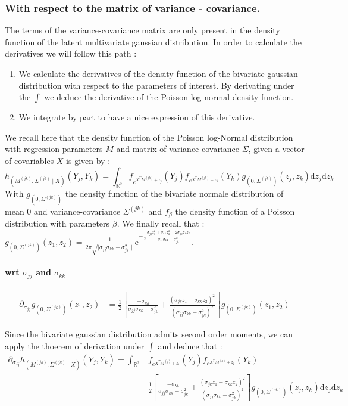 \documentclass[11pt, a4paper]{article}
\begin{document}
\subsubsection{With respect to the matrix of variance - covariance.}
The terms of the variance-covariance matrix are only present in the density function of the latent multivariate gaussian distribution. In order to calculate the derivatives we will  follow this path :
\begin{enumerate}
\item We calculate the derivatives of the density function of the bivariate gaussian distribution with respect to the parameters of interest. By derivating under the $\int$ we deduce the derivative of the Poisson-log-normal density function.
\item We integrate by part to have a nice expression of this derivative.
\end{enumerate}
We recall here that the density function of the Poisson log-Normal distribution with regression parameters $M$ and matrix of variance-covariance $\Sigma$, given a vector of covariables $X$ is given by :
\begin{equation*}
h_{(M^{(jk)},\Sigma^{(jk)} \mid X)}(Y_j,Y_k)=\int_{\mathbb{R}^2} f_{e^{X^T M^{(jk)}+z_j}}(Y_j) f_{e^{X^T M^{(jk)}+z_k}}(Y_k) g_{(0,\Sigma^{(jk)})}(z_j,z_k) \mathrm{d}z_j \mathrm{d}z_k
\end{equation*}
With $g_{(0,\Sigma^{(jk)})}$ the density function of the bivariate normale distribution of mean $0$ and variance-covariance $\Sigma^{(jk)}$ and $f_{\beta}$ the density function of a Poisson distribution with parameters $\beta$.
We finally recall that : $g_{(0,\Sigma^{(jk)})}(z_1,z_2)=\frac{1}{2 \pi \sqrt{\mid \sigma_{jj} \sigma_{kk}-\sigma_{jk}^2}\mid} \mathrm{e}^{-\frac{1}{2} \frac{\sigma_{jj} z_1^2 + \sigma_{kk} z_2^2 -2 \sigma_{jk} z_1 z_2}{\sigma_{jj} \sigma_{kk}-\sigma_{jk}^2}}$.

\paragraph{wrt $\sigma_{jj}$ and $\sigma_{kk}$}
\begin{align*}
\partial_{\sigma_{jj}} g_{(0,\Sigma^{(jk)})} (z_1,z_2) &= \frac{1}{2} [ \frac{-\sigma_{kk}}{\sigma_{jj} \sigma_{kk}-\sigma_{jk}^2} +  \frac{(\sigma_{jk} z_1 - \sigma_{kk} z_2)^2}{(\sigma_{jj} \sigma_{kk}-\sigma_{jk}^2)^2}  ]g_{(0,\Sigma^{(jk)})}(z_1,z_2)
\end{align*}

Since the bivariate gaussian distribution admits second order moments, we can apply  the thoerem of derivation under $\int$ and deduce that :
\begin{align*}
\partial_{\sigma_{jj}} h_{(M^{(jk)},\Sigma^{(jk)} \mid X)}(Y_j,Y_k) =\int_{\mathbb{R}^2} & f_{e^{X^T M^{(j)}+z_1}}(Y_j) f_{e^{X^T M^{(k)}+z_2}}(Y_k)\\
&\frac{1}{2} [ \frac{-\sigma_{kk}}{\sigma_{jj} \sigma_{kk}-\sigma_{jk}^2} +  \frac{(\sigma_{jk} z_1 - \sigma_{kk} z_2)^2}{(\sigma_{jj} \sigma_{kk}-\sigma_{jk}^2)^2}  ] g_{(0,\Sigma^{(jk)})}(z_j,z_k) \mathrm{d}z_j \mathrm{d}z_k
\end{align*}
\end{document}
